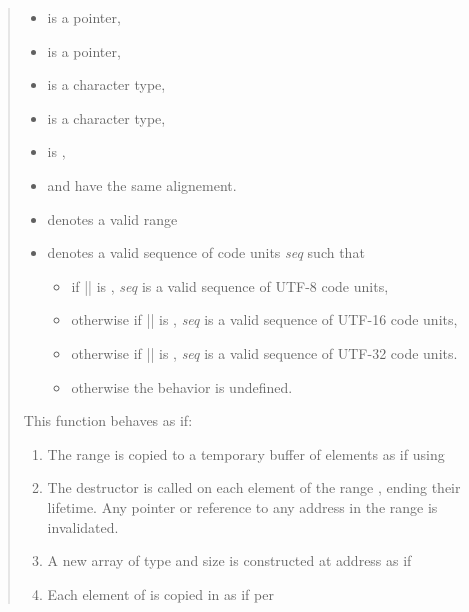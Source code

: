 \documentclass{wg21}
\begin{document}
\begin{quote}
\begin{addedblock}
\begin{itemdescr}
\constraints
\begin{itemize}
\item {} is a pointer,
\item {} is a pointer,
\item {} is a character type,
\item {} is a character type,
\item {} is ,
\item {} and  have the same alignement.
\end{itemize}
\expects
\begin{itemize}
\item {} denotes a valid range
\item {} denotes a valid sequence of code units \emph{seq} such that
\begin{itemize}
    \item if  ||  is , \emph{seq} is a valid sequence of UTF-8 code units,
    \item otherwise if  ||  is , \emph{seq} is a valid sequence of UTF-16 code units,
    \item otherwise if  ||  is , \emph{seq} is a valid sequence of UTF-32 code units.
    \item otherwise the behavior is undefined.
\end{itemize}
\end{itemize}

\effects
This function behaves as if:

\begin{enumerate}
\item The range  is copied to a temporary buffer  of  elements as if using 
\item The destructor  is called on each element of the range , ending their lifetime. Any pointer or reference to any address in the range  is invalidated.
\item A new array  of type  and size  is constructed at address  as if 
\item Each element of  is copied in  as if per 


\end{enumerate}
\end{itemdescr}
\end{addedblock}
\end{quote}
\end{document}
